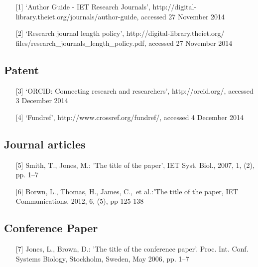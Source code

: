 \documentclass{cta-author}
\begin{document}
\begin{enumerate}
\item[{[1]}] `Author Guide - IET Research Journals',
http://digital-library.theiet.org/journals/author-guide, accessed 27
November 2014\vspace*{6pt}

\item[{[2]}] `Research journal length policy',
http://digital-library.theiet.org/ files/research\_journals\_length\_policy.pdf,
accessed 27 November 2014
\end{enumerate}

\subsection{Patent}\label{subsec13.2}

\begin{enumerate}
\item[{[3]}] `ORCID: Connecting research and researchers', http://orcid.org/,
accessed 3 December 2014\vspace*{6pt}

\item[{[4]}]
`Fundref', http://www.crossref.org/fundref/, accessed 4 December 2014
\end{enumerate}

\subsection{Journal articles}\label{subsec13.3}

\begin{enumerate}
\item[{[5]}] Smith, T., Jones, M.: 'The title of the paper', IET Syst. Biol., 2007,
1, (2), pp. 1--7\vspace*{6pt}

\item[{[6]}] Borwn, L., Thomas, H., James, C.,~et al.:'The title of the paper, IET
Communications, 2012, 6, (5), pp 125-138
\end{enumerate}

\subsection{Conference Paper}\label{subsec13.4}

\begin{enumerate}
\item[{[7]}]
Jones, L., Brown, D.: 'The title of the conference paper'. Proc. Int.
Conf. Systems Biology, Stockholm, Sweden, May 2006, pp. 1--7
\end{enumerate}
\end{document}

